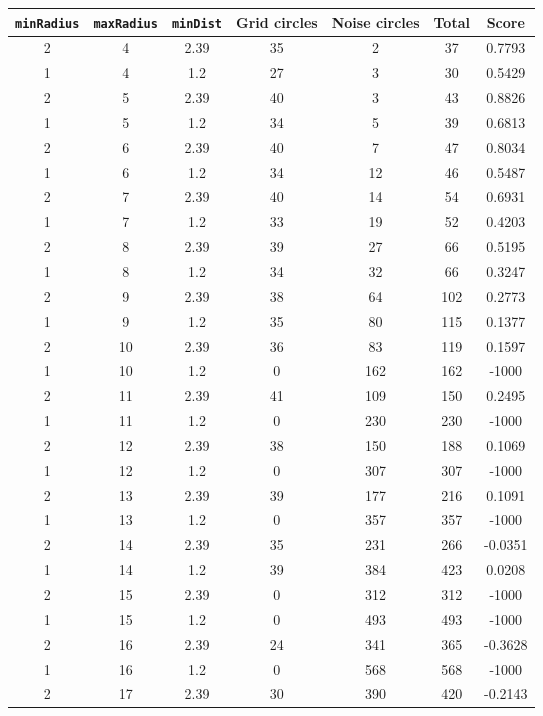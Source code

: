 \documentclass[letterpaper, 12pt]{article}
\begin{document}
\begin{longtable}{|c|c|c|c|c|c|c|}
\hline
\textbf{\texttt{minRadius}} & \textbf{\texttt{maxRadius}} & \textbf{\texttt{minDist}} & \textbf{Grid circles} & \textbf{Noise circles} & \textbf{Total} & \textbf{Score} \\
\hline
2 & 4 & 2.39 & 35 & 2 & 37 & 0.7793 \\
\hline
1 & 4 & 1.2 & 27 & 3 & 30 & 0.5429 \\
\hline
2 & 5 & 2.39 & 40 & 3 & 43 & 0.8826 \\
\hline
1 & 5 & 1.2 & 34 & 5 & 39 & 0.6813 \\
\hline
2 & 6 & 2.39 & 40 & 7 & 47 & 0.8034 \\
\hline
1 & 6 & 1.2 & 34 & 12 & 46 & 0.5487 \\
\hline
2 & 7 & 2.39 & 40 & 14 & 54 & 0.6931 \\
\hline
1 & 7 & 1.2 & 33 & 19 & 52 & 0.4203 \\
\hline
2 & 8 & 2.39 & 39 & 27 & 66 & 0.5195 \\
\hline
1 & 8 & 1.2 & 34 & 32 & 66 & 0.3247 \\
\hline
2 & 9 & 2.39 & 38 & 64 & 102 & 0.2773 \\
\hline
1 & 9 & 1.2 & 35 & 80 & 115 & 0.1377 \\
\hline
2 & 10 & 2.39 & 36 & 83 & 119 & 0.1597 \\
\hline
1 & 10 & 1.2 & 0 & 162 & 162 & -1000 \\
\hline
2 & 11 & 2.39 & 41 & 109 & 150 & 0.2495 \\
\hline
1 & 11 & 1.2 & 0 & 230 & 230 & -1000 \\
\hline
2 & 12 & 2.39 & 38 & 150 & 188 & 0.1069 \\
\hline
1 & 12 & 1.2 & 0 & 307 & 307 & -1000 \\
\hline
2 & 13 & 2.39 & 39 & 177 & 216 & 0.1091 \\
\hline
1 & 13 & 1.2 & 0 & 357 & 357 & -1000 \\
\hline
2 & 14 & 2.39 & 35 & 231 & 266 & -0.0351 \\
\hline
1 & 14 & 1.2 & 39 & 384 & 423 & 0.0208 \\
\hline
2 & 15 & 2.39 & 0 & 312 & 312 & -1000 \\
\hline
1 & 15 & 1.2 & 0 & 493 & 493 & -1000 \\
\hline
2 & 16 & 2.39 & 24 & 341 & 365 & -0.3628 \\
\hline
1 & 16 & 1.2 & 0 & 568 & 568 & -1000 \\
\hline
2 & 17 & 2.39 & 30 & 390 & 420 & -0.2143 \\

\end{longtable}
\end{document}
